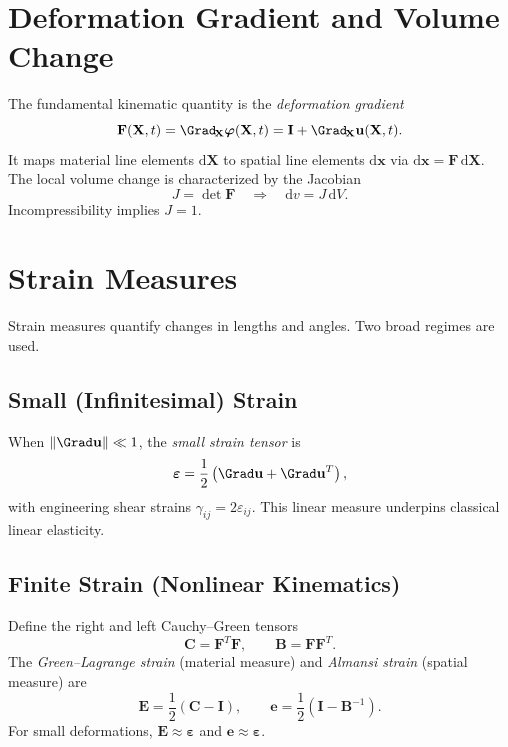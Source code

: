 \documentclass[12pt,a4paper]{article}
\begin{document}
\section{Deformation Gradient and Volume Change}
The fundamental kinematic quantity is the \emph{deformation gradient}
\begin{equation}
\mathbf{F}(\mathbf{X},t) = \Grad_{\!\mathbf{X}} \boldsymbol{\varphi}(\mathbf{X},t) = \mathbf{I} + \Grad_{\!\mathbf{X}}\mathbf{u}(\mathbf{X},t).
\end{equation}
It maps material line elements $\mathrm{d}\mathbf{X}$ to spatial line elements $\mathrm{d}\mathbf{x}$ via $\mathrm{d}\mathbf{x} = \mathbf{F}\,\mathrm{d}\mathbf{X}$. The local volume change is characterized by the Jacobian
\begin{equation}
J = \det \mathbf{F} \quad\Rightarrow\quad \mathrm{d}v = J\,\mathrm{d}V.
\end{equation}
Incompressibility implies $J=1$.

\section{Strain Measures}
Strain measures quantify changes in lengths and angles. Two broad regimes are used.

\subsection{Small (Infinitesimal) Strain}
When $\|\Grad \mathbf{u}\|\ll 1$, the \emph{small strain tensor} is
\begin{equation}
\boldsymbol{\varepsilon} = \dfrac{1}{2}\left(\Grad \mathbf{u} + \Grad \mathbf{u}^{T}\right),
\end{equation}
with engineering shear strains $\gamma_{ij}=2\varepsilon_{ij}$. This linear measure underpins classical linear elasticity.

\subsection{Finite Strain (Nonlinear Kinematics)}
Define the right and left Cauchy--Green tensors
\begin{equation}
\mathbf{C} = \mathbf{F}^{T}\mathbf{F}, \qquad \mathbf{B} = \mathbf{F}\mathbf{F}^{T}.
\end{equation}
The \emph{Green--Lagrange strain} (material measure) and \emph{Almansi strain} (spatial measure) are
\begin{equation}
\mathbf{E} = \dfrac{1}{2}(\mathbf{C}-\mathbf{I}), \qquad \mathbf{e} = \dfrac{1}{2}(\mathbf{I}-\mathbf{B}^{-1}).
\end{equation}
For small deformations, $\mathbf{E}\approx \boldsymbol{\varepsilon}$ and $\mathbf{e}\approx \boldsymbol{\varepsilon}$.
\end{document}
